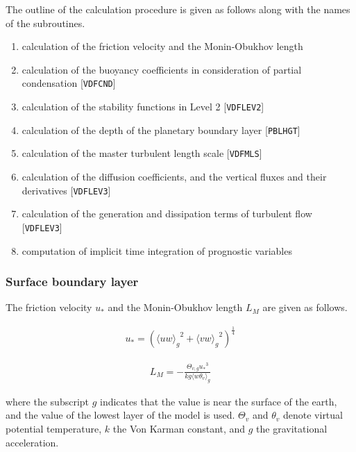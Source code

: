 The outline of the calculation procedure is given as follows along with
the names of the subroutines.

\begin{enumerate}
\def\labelenumi{\arabic{enumi}.}
\tightlist
\item
  calculation of the friction velocity and the Monin-Obukhov length
\item
  calculation of the buoyancy coefficients in consideration of partial
  condensation {[}\texttt{VDFCND}{]}
\item
  calculation of the stability functions in Level 2
  {[}\texttt{VDFLEV2}{]}
\item
  calculation of the depth of the planetary boundary layer
  {[}\texttt{PBLHGT}{]}
\item
  calculation of the master turbulent length scale {[}\texttt{VDFMLS}{]}
\item
  calculation of the diffusion coefficients, and the vertical fluxes and
  their derivatives {[}\texttt{VDFLEV3}{]}
\item
  calculation of the generation and dissipation terms of turbulent flow
  {[}\texttt{VDFLEV3}{]}
\item
  computation of implicit time integration of prognostic variables
\end{enumerate}

\hypertarget{surface-boundary-layer}{%
\subsubsection{Surface boundary layer}\label{surface-boundary-layer}}

The friction velocity \(u_*\) and the Monin-Obukhov length \(L_M\) are
given as follows.

\begin{eqnarray}u_*=\left({\langle uw \rangle_g}^2+{\langle vw \rangle_g}^2 \right)^\frac{1}{4}\end{eqnarray}

\begin{eqnarray}L_M=-\frac{\Theta_{v,g} {u_*}^3}{kg \langle w\theta_v \rangle_g}\end{eqnarray}

where the subscript \(g\) indicates that the value is near the surface
of the earth, and the value of the lowest layer of the model is used.
\(\Theta_v\) and \(\theta_v\) denote virtual potential temperature,
\(k\) the Von Karman constant, and \(g\) the gravitational acceleration.

